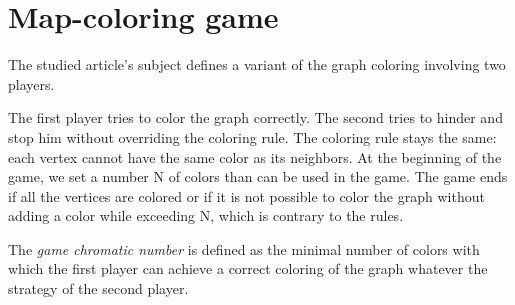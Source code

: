 \section{Map-coloring game}

The studied article's subject defines a variant of the graph coloring involving two players.

The first player tries to color the graph correctly. The second tries to hinder and stop him without overriding the coloring rule. The coloring rule stays the same: each vertex cannot have the same color as its neighbors. 
At the beginning of the game, we set a number N of colors than can be used in the game. The game ends if all the vertices are colored or if it is not possible to color the graph without adding a color while exceeding N, which is contrary to the rules.

 
The \textit{game chromatic number} is defined as the minimal number of colors with which the first player can achieve a correct coloring of the graph whatever the strategy of the second player.
